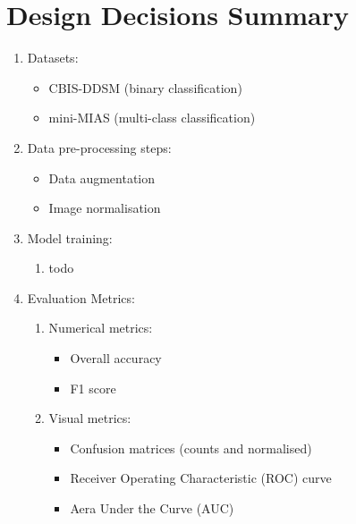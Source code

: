 
\section{Design Decisions Summary}

\begin{enumerate}
    \item Datasets:
    \begin{itemize}
        \item CBIS-DDSM (binary classification)
        \item mini-MIAS (multi-class classification)
    \end{itemize}
    
    \item Data pre-processing steps:
    \begin{itemize}
        \item Data augmentation
        \item Image normalisation
    \end{itemize}
    
    \item Model training:
     \begin{enumerate}
        \item todo
    \end{enumerate}
    
    \item Evaluation Metrics:
    \begin{enumerate}
        \item Numerical metrics:
        \begin{itemize}
            \item Overall accuracy
            \item F1 score
        \end{itemize}
        \item Visual metrics:
        \begin{itemize}
            \item Confusion matrices (counts and normalised)
            \item Receiver Operating Characteristic (ROC) curve
            \item Aera Under the Curve (AUC)
        \end{itemize}
    \end{enumerate}
    

\end{enumerate}
